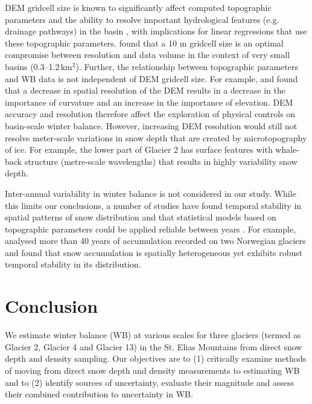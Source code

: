 \documentclass[review,oneside, letterpaper]{igs}
\begin{document}
DEM gridcell size is known to significantly affect computed topographic parameters and the ability to resolve important hydrological features (e.g. drainage pathways) in the basin \citep{Zhang1994, Garbrecht1994, Guo-an2001, Lopez2010}, with implications for linear regressions that use these topographic parameters. \cite{Zhang1994} found that a 10 m gridcell size is an optimal compromise between resolution and data volume in the context of very small basins (0.3--1.2\,km$^2$). Further, the relationship between topographic parameters and WB data is not independent of DEM gridcell size. For example, \cite{Kienzle2004} and \cite{ Lopez2010} found that a decrease in spatial resolution of the DEM results in a decrease in the importance of curvature and an increase in the importance of elevation. DEM accuracy and resolution therefore affect the exploration of physical controls on basin-scale winter balance. However, increasing DEM resolution would still not resolve meter-scale variations in snow depth that are created by microtopography of ice. For example, the lower part of Glacier 2 has surface features with whale-back structure (metre-scale wavelengths) that results in highly variability snow depth.

Inter-annual variability in winter balance is not considered in our study. While this limits our conclusions, a number of studies have found temporal stability in spatial patterns of snow distribution and that statistical models based on topographic parameters could be applied reliable between years \citep[e.g.][]{Grunewald2013}. For example, \cite{Walmsley2015} analysed more than 40 years of accumulation recorded on two Norwegian glaciers and found that snow accumulation is spatially heterogeneous yet exhibits robust temporal stability in its distribution. 

\section{Conclusion}

We estimate winter balance (WB) at various scales for three glaciers (termed as Glacier 2, Glacier 4 and Glacier 13) in the St. Elias Mountains from direct snow depth and density sampling. Our objectives are to (1) critically examine methods of moving from direct snow depth and density measurements to estimating WB and to (2) identify sources of uncertainty, evaluate their magnitude and assess their combined contribution to uncertainty in WB.
\end{document}
